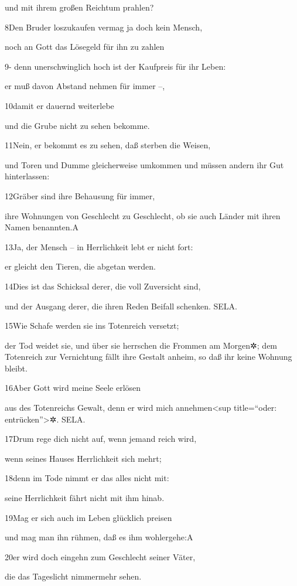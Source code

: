 und mit ihrem großen Reichtum prahlen?

8Den Bruder loszukaufen vermag ja doch kein Mensch,

noch an Gott das Lösegeld für ihn zu zahlen

9- denn unerschwinglich hoch ist der Kaufpreis für ihr Leben:

er muß davon Abstand nehmen für immer --,

10damit er dauernd weiterlebe

und die Grube nicht zu sehen bekomme.

11Nein, er bekommt es zu sehen, daß sterben die Weisen,

und Toren und Dumme gleicherweise umkommen und müssen andern ihr Gut
hinterlassen:

12Gräber sind ihre Behausung für immer,

ihre Wohnungen von Geschlecht zu Geschlecht, ob sie auch Länder mit
ihren Namen benannten.{A}

13Ja, der Mensch -- in Herrlichkeit lebt er nicht fort:

er gleicht den Tieren, die abgetan werden.

14Dies ist das Schicksal derer, die voll Zuversicht sind,

und der Ausgang derer, die ihren Reden Beifall schenken. SELA.

15Wie Schafe werden sie ins Totenreich versetzt;

der Tod weidet sie, und über sie herrschen die Frommen am Morgen✲; dem
Totenreich zur Vernichtung fällt ihre Gestalt anheim, so daß ihr keine
Wohnung bleibt.

16Aber Gott wird meine Seele erlösen

aus des Totenreichs Gewalt, denn er wird mich annehmen\textless sup
title=``oder: entrücken''\textgreater✲. SELA.

17Drum rege dich nicht auf, wenn jemand reich wird,

wenn seines Hauses Herrlichkeit sich mehrt;

18denn im Tode nimmt er das alles nicht mit:

seine Herrlichkeit fährt nicht mit ihm hinab.

19Mag er sich auch im Leben glücklich preisen

und mag man ihn rühmen, daß es ihm wohlergehe:{A}

20er wird doch eingehn zum Geschlecht seiner Väter,

die das Tageslicht nimmermehr sehen.

